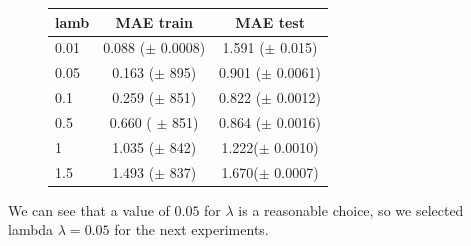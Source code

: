 \begin{figure}[h]
\begin{minipage}{\textwidth}
\begin{minipage}[b]{0.45\textwidth}
  \end{minipage}
  \hfill
  \begin{minipage}[b]{0.5\textwidth}
  \begin{center}
  \begin{tabular}{ |l | c | c| }
    \hline
     lamb & MAE train & MAE test \\ \hline
     0.01   & 0.088 ($\pm$  0.0008) &  1.591 ($\pm$ 0.015) \\ \hline
     0.05  &  0.163 ($\pm$  895) &  0.901 ($\pm$  0.0061) \\ \hline
     0.1     & 0.259 ($\pm$ 851)  & 0.822 ($\pm$ 0.0012) \\ \hline
     0.5    & 0.660  ( $\pm$ 851) & 0.864 ($\pm$  0.0016)\\ \hline
     1       & 1.035 ($\pm$ 842) & 1.222($\pm$  0.0010)\\ \hline
     1.5    & 1.493 ($\pm$ 837) & 1.670($\pm$  0.0007) \\
    \hline
  \end{tabular}
\end{center}
	\vspace{10 mm}
    \end{minipage}
    
\label{fig:ALS_lambdas} 
  \end{minipage}
\end{figure}  
  
We can see that a value of $0.05$ for $\lambda$ is a reasonable choice, so we selected lambda $\lambda=0.05$ for the next experiments. 


